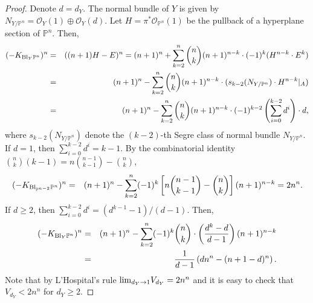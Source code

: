 \documentclass[12pt]{amsart}
\theoremstyle{definition}
\def\lim{{\rm lim}}
\def\bl{{\rm Bl}}
\newcommand{\IP}{{\mathbb P}}
\newcommand{\CO}{{\mathcal O}}
\newcommand{\gee}{\geqslant}
\begin{document}
\begin{proof}
    Denote $d=d_Y$. The normal bundle of $Y$ is given by $N_{Y/\IP^n}=\CO_Y(1)\oplus \CO_Y(d)$. Let $H=\pi^*\CO_{\IP^n}(1)$ be the pullback of a hyperplane section of $\IP^n$. Then,
\begin{eqnarray*}
    (-K_{\bl_Y\IP^n})^n &=& ((n+1)H-E)^n = (n+1)^n+\sum_{k=2}^n \binom{n}{k}(n+1)^{n-k}\cdot(-1)^k(H^{n-k}\cdot E^k)\\
    &=&  (n+1)^n-\sum_{k=2}^n \binom{n}{k}(n+1)^{n-k}\cdot(s_{k-2}(N_{Y/\IP^n})\cdot H^{n-k}|_A)\\
    &=& (n+1)^n-\sum_{k=2}^n \binom{n}{k}(n+1)^{n-k}\cdot (-1)^{k-2}\left(\sum_{i=0}^{k-2} d^i\right)\cdot d,
\end{eqnarray*}
where $s_{k-2}(N_{Y/\IP^n})$ denote the $(k-2)$-th Segre class of normal bundle $N_{Y/\IP^n}$. If $d=1$, then $\sum_{i=0}^{k-2}d^i=k-1$. By the combinatorial identity $\binom{n}{k}(k-1)=n\binom{n-1}{k-1}-\binom{n}{k}$, 
\begin{eqnarray*}
    (-K_{\bl_{\IP^{n-2}}\IP^n})^n
    &=& (n+1)^n-\sum_{k=2}^n (-1)^k\left[n\binom{n-1}{k-1}-\binom{n}{k}\right](n+1)^{n-k} = 2n^n.
\end{eqnarray*}
If $d\gee 2$, then $\sum_{i=0}^{k-2}d^i=(d^{k-1}-1)/(d-1)$. Then,
\begin{eqnarray*}
    (-K_{\bl_{Y}\IP^n})^n
    &=& (n+1)^n-\sum_{k=2}^n (-1)^k\binom{n}{k}\cdot\left(\frac{d^k-d}{d-1}\right)(n+1)^{n-k}\\
    &=& \frac{1}{d-1}\left(dn^n-(n+1-d)^n\right).
\end{eqnarray*}
Note that by L'Hospital's rule $\lim_{d_Y\rightarrow 1}V_{d_Y}=2n^n$ and it is easy to check that $V_{d_Y}<2 n^n$ for $d_Y\ge 2$. 
\end{proof}
\end{document}
